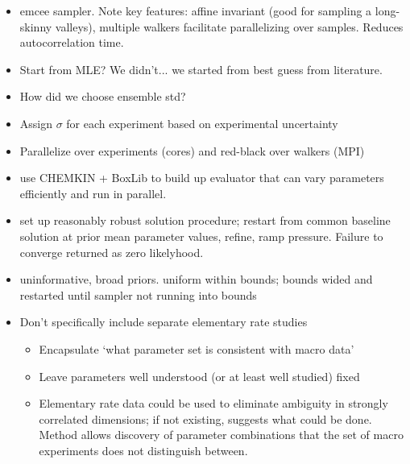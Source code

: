 \documentclass[preprint,3p,times,twocolumn]{elsarticle}
\begin{document}
\begin{itemize}
    \item emcee sampler. Note key features: affine invariant (good for sampling a long-skinny valleys), 
    multiple walkers facilitate parallelizing over samples. Reduces autocorrelation time. 
    \item Start from MLE? We didn't... we started from best guess from literature. 
    \item How did we choose ensemble std?
    \item Assign $\sigma$ for each experiment based on experimental uncertainty
    \item Parallelize over experiments (cores) and red-black over walkers (MPI)
    \item use CHEMKIN + BoxLib to build up evaluator that can vary
      parameters efficiently and run in parallel.
    \item set up reasonably robust solution procedure; restart from
      common baseline solution at prior mean parameter values, refine,
      ramp pressure. Failure to converge returned as zero likelyhood.
    \item uninformative, broad priors. uniform within bounds; bounds
      wided and restarted until sampler not running into bounds
    \item Don't specifically include separate elementary rate studies
        \begin{itemize}
        \item Encapsulate `what parameter set is consistent with macro
          data'
        \item Leave parameters well understood (or at least well studied)
          fixed
        \item Elementary rate data could be used to eliminate
          ambiguity in strongly correlated dimensions; if not
          existing, suggests what could be done. Method allows
          discovery of parameter combinations that the set of macro
          experiments does not distinguish between.
 \end{itemize}
\end{itemize}
\end{document}
